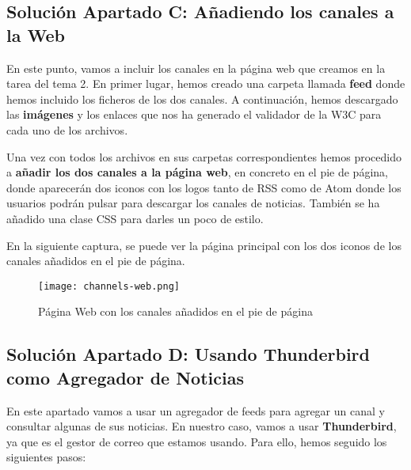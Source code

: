\subsection{Solución Apartado C: Añadiendo los canales a la Web}
En este punto, vamos a incluir los canales en la página web que creamos en la tarea del tema 2. En primer lugar, hemos creado una carpeta llamada \textbf{feed} donde hemos incluido los ficheros de los dos canales. A continuación, hemos descargado las \textbf{imágenes} y los enlaces que nos ha generado el validador de la W3C para cada uno de los archivos.

Una vez con todos los archivos en sus carpetas correspondientes hemos procedido a \textbf{añadir los dos canales a la página web}, en concreto en el pie de página, donde aparecerán dos iconos con los logos tanto de RSS como de Atom donde los usuarios podrán pulsar para descargar los canales de noticias. También se ha añadido una clase CSS para darles un poco de estilo.

En la siguiente captura, se puede ver la página principal con los dos iconos de los canales añadidos en el pie de página.

\begin{figure}[H]
    \centering
    \texttt{[image: channels-web.png]}
    \caption{Página Web con los canales añadidos en el pie de página}
\end{figure}

\subsection{Solución Apartado D: Usando Thunderbird como Agregador de Noticias}
En este apartado vamos a usar un agregador de feeds para agregar un canal y consultar algunas de sus noticias. En nuestro caso, vamos a usar \textbf{Thunderbird}, ya que es el gestor de correo que estamos usando. Para ello, hemos seguido los siguientes pasos:

